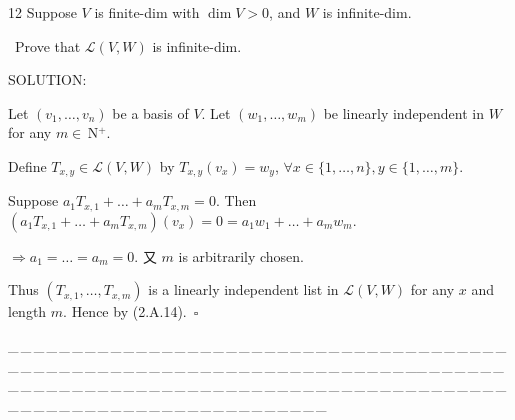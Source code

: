 \documentclass[a4paper, 11pt, UTF8]{article}
\def\Lm{\mathcal{L}}
\def\Nbp{$\,{\timesbf N}$^+}
\begin{document}
\begin{large}
{\timesbf\Large 12} {\timessl\Large 
Suppose $V$ is finite-dim with $\dim V > 0$, and $W$ is infinite-dim.}\par\quad\,
{\timessl\Large Prove that $\Lm(V, W)$ is infinite-dim.
}\par
{\timesbf S\footnotesize{OLUTION:}}\par\quad
Let $(v_1,\dots,v_n)$ be a basis of $V$. Let $(w_1,\dots,w_m)$ be linearly independent in $W$ for any $m\in\Nbp$.\par\quad
Define $T_{x,y}\in\Lm(V,W)$ by $T_{x,y}(v_x)=w_y$, $\forall x\in\{1,\dots,n\},y\in\{1,\dots,m\}$.\par\quad
Suppose $a_1 T_{x,1}+\dots+a_m T_{x,m}=0$. Then $(a_1 T_{x,1}+\dots+a_m T_{x,m})(v_x)=0=a_1 w_1+\dots+a_m w_m.$\par\quad
$\Rightarrow a_1=\dots=a_m=0.$ 又 $m$ is arbitrarily chosen.\par\quad
Thus $(T_{x,1},\dots,T_{x,m})$ is a linearly independent list in $\Lm(V,W)$ for any $x$ and length $m$. Hence by (2.A.14).$\,\,\,\square$\par
{\tiny \_\,\_\,\_\,\_\,\_\,\_\,\_\,\_\,\_\,\_\,\_\,\_\,\_\,\_\,\_\,\_\,\_\,\_\,\_\,\_\,\_\,\_\,\_\,\_\,\_\,\_\,\_\,\_\,\_\,\_\,\_\,\_\,\_\,\_\,\_\,\_\,\_\,\_\,\_\,\_\,\_\,\_\,\_\,\_\,\_\,\_\,\_\,\_\,\_\,\_\,\_\,\_\,\_\,\_\,\_\,\_\,\_\,\_\,\_\,\_\,\_\,\_\,\_\,\_\,\_\,\_\,\_\,\_\,\_\,\_\,\_\_\,\_\,\_\,\_\,\_\,\_\,\_\,\_\,\_\,\_\,\_\,\_\,\_\,\_\,\_\,\_\,\_\,\_\,\_\,\_\,\_\,\_\,\_\,\_\,\_\,\_\,\_\,\_\,\_\,\_\,\_\,\_\,\_\,\_\,\_\,\_\,\_\,\_\,\_\,\_\,\_\,\_\,\_\,\_\,\_\,\_\,\_\,\_\,\_\,\_\,\_\,\_\,\_\,\_\,\_\,\_\,\_\,\_\,\_\,\_\,\_\,\_\,\_\,\_\,\_\,\_\,\_\,\_\,\_\,\_\,\_}{\tiny\,\par}


\end{large}
\end{document}

